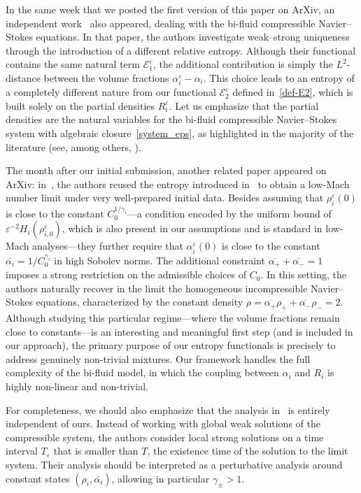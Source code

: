 \documentclass[11pt, twoside, a4paper]{article}
\theoremstyle{plain}
\theoremstyle{remark}
\numberwithin{equation}{section}
\begin{document}
In the same week that we posted the first version of this paper on ArXiv, an independent work~\cite{li2026weak} also appeared, dealing with the bi-fluid compressible Navier--Stokes equations. In that paper, the authors investigate weak--strong uniqueness through the introduction of a different relative entropy. Although their functional contains the same natural term $\mathcal{E}_1^\varepsilon$, the additional contribution is simply the $L^2$-distance between the volume fractions $\alpha_i^\varepsilon - \alpha_i$. This choice leads to an entropy of a completely different nature from our functional $\mathcal{E}_2^\varepsilon$ defined in~\eqref{def-E2}, which is built solely on the partial densities $R_i^\varepsilon$. Let us emphasize that the partial densities are the natural variables for the bi-fluid compressible Navier--Stokes system with algebraic closure~\eqref{system_eps}, as highlighted in the majority of the literature (see, among others, \cite{bresch2019finite,novotny2020weak}). 

The month after our initial submission, another related paper appeared on ArXiv: in~\cite{li2026lowmachnumberlimit}, the authors reused the entropy introduced in~\cite{li2026weak} to obtain a low-Mach number limit under very well-prepared initial data. Besides assuming that $\rho_i^\varepsilon(0)$ is close to the constant $C_0^{1/\gamma_i}$---a condition encoded by the uniform bound of $\varepsilon^{-2} H_i(\rho_{i,0}^\varepsilon)$, which is also present in our assumptions and is standard in low-Mach analyses---they further require that $\alpha_i^\varepsilon(0)$ is close to the constant $\overline{\alpha_i} = 1/C_0^{\gamma_i}$ in high Sobolev norms. The additional constraint $\overline{\alpha_+} + \overline{\alpha_-} = 1$ imposes a strong restriction on the admissible choices of $C_0$. In this setting, the authors naturally recover in the limit the homogeneous incompressible Navier--Stokes equations, characterized by the constant density $\rho = \overline{\alpha_+} \rho_+ + \overline{\alpha_-} \rho_- = 2$.
Although studying this particular regime---where the volume fractions remain close to constants---is an interesting and meaningful first step (and is included in our approach), the primary purpose of our entropy functionals is precisely to address genuinely non-trivial mixtures. Our framework handles the full complexity of the bi-fluid model, in which the coupling between $\alpha_i$ and $R_i$ is highly non-linear and non-trivial.

For completeness, we should also emphasize that the analysis in~\cite{li2026lowmachnumberlimit} is entirely independent of ours. Instead of working with global weak solutions of the compressible system, the authors consider local strong solutions on a time interval $T_\varepsilon$ that is smaller than $T$, the existence time of the solution to the limit system. Their analysis should be interpreted as a perturbative analysis around constant states $(\rho_i, \overline{\alpha_i})$, allowing in particular $\gamma_\pm>1$.
\end{document}
